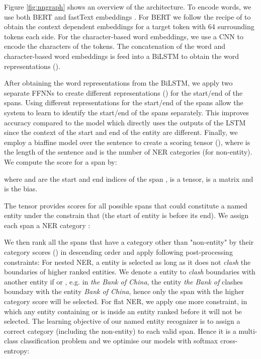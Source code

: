 \documentclass[11pt,a4paper]{article}
\begin{document}
Figure \ref{fig:nngraph} shows an overview of the architecture. To encode words, we use both BERT and fastText embeddings \cite{bojanowski2016enriching}. For BERT we follow the recipe of \cite{kantor2019bertee} to obtain the context dependent embeddings for a target token with 64 surrounding tokens each side. 
For the character-based word embeddings, we use a CNN to encode the characters of the tokens. The concatenation of the word and character-based word embeddings is feed into a BiLSTM to obtain the word representations ().



After obtaining the word representations from the BiLSTM, we apply two separate FFNNs to create different representations () for the start/end of the spans. Using different representations for the start/end of the spans allow the system to learn 
to identify the start/end of the spans separately. This improves accuracy compared to the model which directly uses the outputs of the LSTM since the context of the start and end of the entity are different. Finally, we employ a biaffine model over the sentence to create a  scoring tensor (), where  is the length of the sentence and  is the number of NER categories (for non-entity). 
We compute the score for a span  by:

\vspace{-10pt}

where  and  are the start and end indices of the span ,  is a  tensor,  is a  matrix and  is the bias. 

The tensor  provides scores for all possible spans that could constitute a named entity under the constrain that  (the start of entity is before its end).
We assign each span a NER category :

\vspace{-5pt}

We then rank all the spans that have a category other than "non-entity" by their category scores () in descending order and apply following post-processing constraints: For nested NER, a entity is selected as long as it does not {\it clash} the boundaries of higher ranked entities. We denote a entity  to {\it clash} boundaries with another entity  if  or , e.g. in \textit{the Bank of China}, the entity \textit{the Bank of} clashes boundary with the entity \textit{Bank of China}, hence only the span with the higher category score will be selected. For flat NER, we apply one more constraint, in which any entity containing or is inside an entity ranked before it will not be selected. 
The learning objective of our named entity recognizer is to assign a correct category (including the non-entity) to each valid span. Hence it is a multi-class classification problem and we optimise our models with softmax cross-entropy:
\end{document}
